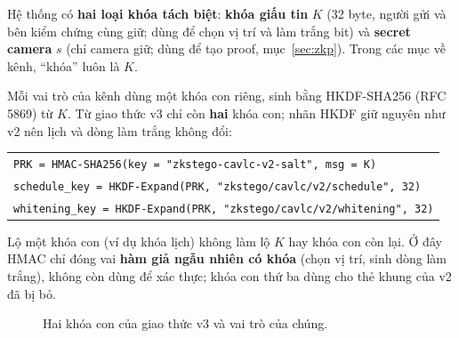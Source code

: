 \documentclass[11pt,a4paper]{article}
\begin{document}
Hệ thống có \textbf{hai loại khóa tách biệt}: \textbf{khóa giấu tin} \(K\) (32 byte,
người gửi và bên kiểm chứng cùng giữ; dùng để chọn vị trí và làm trắng bit) và
\textbf{secret camera} \(s\) (chỉ camera giữ; dùng để tạo proof, mục~\ref{sec:zkp}).
Trong các mục về kênh, ``khóa'' luôn là \(K\).

Mỗi vai trò của kênh dùng một khóa con riêng, sinh bằng HKDF-SHA256 (RFC 5869) từ
\(K\). Từ giao thức v3 chỉ còn \textbf{hai} khóa con; nhãn HKDF giữ nguyên như v2 nên
lịch và dòng làm trắng không đổi:

\begin{center}
\small
\begin{tabular}{l}
\texttt{PRK = HMAC-SHA256(key = "zkstego-cavlc-v2-salt", msg = K)} \\
\texttt{schedule\_key  = HKDF-Expand(PRK, "zkstego/cavlc/v2/schedule",  32)} \\
\texttt{whitening\_key = HKDF-Expand(PRK, "zkstego/cavlc/v2/whitening", 32)} \\
\end{tabular}
\end{center}

Lộ một khóa con (ví dụ khóa lịch) không làm lộ \(K\) hay khóa con còn lại. Ở đây HMAC
chỉ đóng vai \textbf{hàm giả ngẫu nhiên có khóa} (chọn vị trí, sinh dòng làm trắng),
không còn dùng để xác thực; khóa con thứ ba dùng cho thẻ khung của v2 đã bị bỏ.

\begin{figure}[H]
\centering
{}
\caption{Hai khóa con của giao thức v3 và vai trò của chúng.}
\label{fig:hkdf}
\end{figure}
\end{document}
